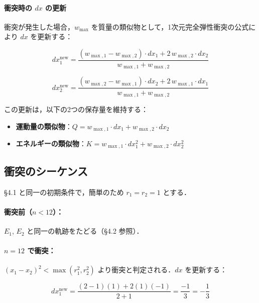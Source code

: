 \documentclass[12pt,a4paper]{ltjsarticle}
\begin{document}
\paragraph{衝突時の $dx$ の更新}

衝突が発生した場合，$w_{\max}$ を質量の類似物として，1次元完全弾性衝突の公式により $dx$ を更新する：

\begin{equation}
dx_1^{\text{new}} = \frac{(w_{\max,1} - w_{\max,2}) \cdot dx_1 + 2\, w_{\max,2} \cdot dx_2}{w_{\max,1} + w_{\max,2}}
\end{equation}

\begin{equation}
dx_2^{\text{new}} = \frac{(w_{\max,2} - w_{\max,1}) \cdot dx_2 + 2\, w_{\max,1} \cdot dx_1}{w_{\max,1} + w_{\max,2}}
\end{equation}

この更新は，以下の2つの保存量を維持する：

\begin{itemize}
  \item \textbf{運動量の類似物}：$Q = w_{\max,1} \cdot dx_1 + w_{\max,2} \cdot dx_2$
  \item \textbf{エネルギーの類似物}：$K = w_{\max,1} \cdot dx_1^2 + w_{\max,2} \cdot dx_2^2$
\end{itemize}

\subsection{衝突のシーケンス}

\S 4.1 と同一の初期条件で，簡単のため $r_1 = r_2 = 1$ とする．

\paragraph{衝突前（$n < 12$）：}

$E_1$, $E_2$ と同一の軌跡をたどる（\S 4.2 参照）．

\paragraph{$n = 12$ で衝突：}

$(x_1 - x_2)^2 < \max(r_1^2, r_2^2)$ より衝突と判定される．$dx$ を更新する：

\begin{equation}
dx_1^{\text{new}} = \frac{(2-1)(1) + 2(1)(-1)}{2+1} = \frac{-1}{3} = -\frac{1}{3}
\end{equation}
\end{document}
